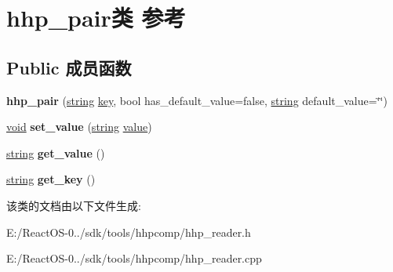 \hypertarget{classhhp__pair}{}\section{hhp\+\_\+pair类 参考}
\label{classhhp__pair}
\subsection*{Public 成员函数}
\begin{DoxyCompactItemize}
\item 
\mbox{\label{classhhp__pair_a7a84b855e8ab86a1b87cbf5bc5641370}} 
{\bfseries hhp\+\_\+pair} (\hyperlink{structstring}{string} \hyperlink{structkey}{key}, bool has\+\_\+default\+\_\+value=false, \hyperlink{structstring}{string} default\+\_\+value=\char`\"{}\char`\"{})
\item 
\mbox{\label{classhhp__pair_aff5e4dcbf4a02042ff907a2e620b0e01}} 
\hyperlink{interfacevoid}{void} {\bfseries set\+\_\+value} (\hyperlink{structstring}{string} \hyperlink{unionvalue}{value})
\item 
\mbox{\label{classhhp__pair_afcdfe34a7cd63de522525d1beccaa483}} 
\hyperlink{structstring}{string} {\bfseries get\+\_\+value} ()
\item 
\mbox{\label{classhhp__pair_ad55b1b5196254371c8a4c2ce5170c744}} 
\hyperlink{structstring}{string} {\bfseries get\+\_\+key} ()
\end{DoxyCompactItemize}


该类的文档由以下文件生成\+:\begin{DoxyCompactItemize}
\item 
E\+:/\+React\+O\+S-\/0../sdk/tools/hhpcomp/hhp\+\_\+reader.\+h\item 
E\+:/\+React\+O\+S-\/0../sdk/tools/hhpcomp/hhp\+\_\+reader.\+cpp\end{DoxyCompactItemize}
